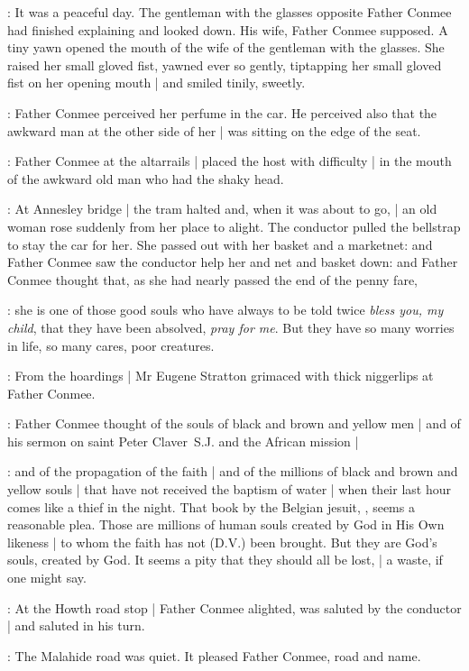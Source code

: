 :
It was a peaceful day.
The gentleman with the glasses opposite Father Conmee
had finished explaining and looked down.
His wife, Father Conmee supposed.
A tiny yawn opened the mouth of the wife of the gentleman with the glasses.
She raised her small gloved fist,
yawned ever so gently,
tiptapping her small gloved fist on her opening mouth |
and smiled tinily, sweetly.

:
Father Conmee perceived her perfume in the car.
He perceived also that the awkward man at the other side of her |
was sitting on the edge of the seat.%

:
Father Conmee at the altarrails |
placed the host with difficulty |
in the mouth of the awkward old man who had the shaky head.

:
At Annesley bridge |
the tram halted and, when it was about to go, |
an old woman rose suddenly from her place to alight.
The conductor pulled the bellstrap to stay the car for her.
She passed out with her basket and a marketnet:
and Father Conmee saw the conductor help her and net and basket down:
and Father Conmee thought
that, as she had nearly passed the end of the penny fare,

\conmeeint:
she is one of those good souls who have always to be told twice
\emph{bless you, my child},
that they have been absolved,
\emph{pray for me}.
But they have so many worries in life,
so many cares, poor creatures.

:
From the hoardings |
Mr Eugene Stratton grimaced with thick niggerlips at Father Conmee.

:
Father Conmee thought of the souls of black and brown and yellow men |
and of his sermon on saint Peter Claver~S.J. and the African mission |

\conmeeint:
and of the propagation of the faith |
and of the millions of black and brown and yellow souls |
that have not received the baptism of water |
when their last hour comes like a thief in the night.
That book by the Belgian jesuit,
,
seems a reasonable plea.
Those are millions of human souls created by God in His Own likeness |
to whom the faith has not (D.V.) been brought.
But they are God's souls, created by God.
It seems a pity that they should all be lost, |
a waste, if one might say.

:
At the Howth road stop |
Father Conmee alighted,
was saluted by the conductor |
and saluted in his turn.

:
The Malahide road was quiet.
It pleased Father Conmee, road and name.

